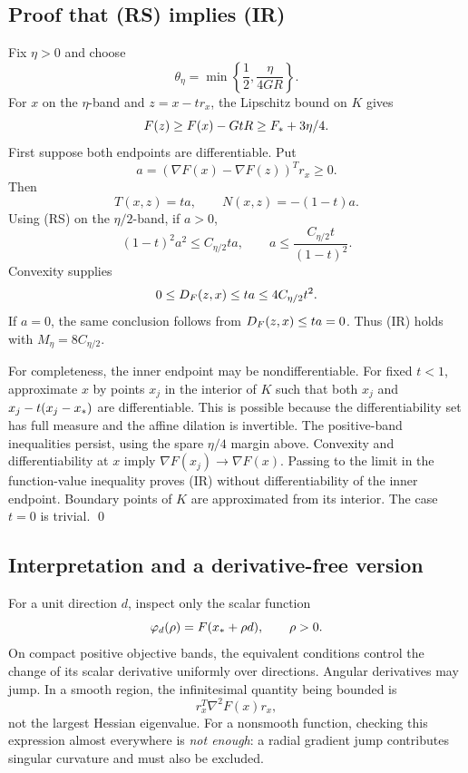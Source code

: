 \subsection{Proof that (RS) implies (IR)}
Fix $\eta>0$ and choose
\[
 \theta_\eta=\min\left\{\frac12,\frac{\eta}{4GR}\right\}.
\]
For $x$ on the $\eta$-band and $z=x-t r_x$, the Lipschitz bound on $K$ gives
\[
 F(z)\ge F(x)-GtR\ge F_*+3\eta/4.
\]
First suppose both endpoints are differentiable. Put
\[
 a=(\nabla F(x)-\nabla F(z))^Tr_x\ge0.
\]
Then
\[
 T(x,z)=ta,\qquad N(x,z)=-(1-t)a.
\]
Using (RS) on the $\eta/2$-band, if $a>0$,
\[
 (1-t)^2a^2\le C_{\eta/2}ta,
 \qquad
 a\le\frac{C_{\eta/2}t}{(1-t)^2}.
\]
Convexity supplies
\[
 0\le D_F(z,x)\le ta\le4C_{\eta/2}t^2.
\]
If $a=0$, the same conclusion follows from $D_F(z,x)\le ta=0$. Thus (IR) holds with $M_\eta=8C_{\eta/2}$.

For completeness, the inner endpoint may be nondifferentiable. For fixed $t<1$, approximate $x$ by points $x_j$ in the interior of $K$ such that both $x_j$ and $x_j-t(x_j-x_*)$ are differentiable. This is possible because the differentiability set has full measure and the affine dilation is invertible. The positive-band inequalities persist, using the spare $\eta/4$ margin above. Convexity and differentiability at $x$ imply $\nabla F(x_j)\to\nabla F(x)$. Passing to the limit in the function-value inequality proves (IR) without differentiability of the inner endpoint. Boundary points of $K$ are approximated from its interior. The case $t=0$ is trivial. \qed

\subsection{Interpretation and a derivative-free version}
For a unit direction $d$, inspect only the scalar function
\[
 \varphi_d(\rho)=F(x_*+\rho d),\qquad \rho>0.
\]
On compact positive objective bands, the equivalent conditions control the change of its scalar derivative uniformly over directions. Angular derivatives may jump. In a smooth region, the infinitesimal quantity being bounded is
\[
 r_x^T\nabla^2F(x)r_x,
\]
not the largest Hessian eigenvalue. For a nonsmooth function, checking this expression almost everywhere is \emph{not enough}: a radial gradient jump contributes singular curvature and must also be excluded.

